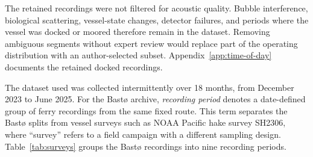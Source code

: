 The retained recordings were not filtered for acoustic quality. Bubble interference, biological scattering, vessel-state changes, detector failures, and periods where the vessel was docked or moored therefore remain in the dataset. Removing ambiguous segments without expert review would replace part of the operating distribution with an author-selected subset. Appendix~\ref{app:time-of-day} documents the retained docked recordings.

The dataset used was collected intermittently over 18 months, from December 2023 to June 2025. For the Bast\o{} archive, \emph{recording period} denotes a date-defined group of ferry recordings from the same fixed route. This term separates the Bast\o{} splits from vessel surveys such as NOAA Pacific hake survey SH2306, where ``survey'' refers to a field campaign with a different sampling design. Table~\ref{tab:surveys} groups the Bast\o{} recordings into nine recording periods.

\begin{table}[htbp]
\centering
\small
\caption{Recording periods from the Bast\o{} Electric dataset. File counts refer to calibrated zarr stores; raw sizes are rounded to the nearest gigabyte.}
\label{tab:surveys}
\end{table}

